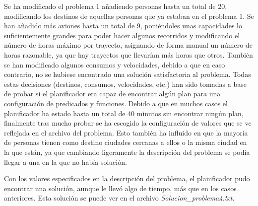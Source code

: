 \documentclass[11pt,a4paper]{article}
\begin{document}
Se ha modificado el problema 1 añadiendo personas hasta un total de 20, modificando los destinos de aquellas personas que ya estaban
en el problema 1. Se han añadido más aviones hasta un total de 9, poniéndoles unas capacidades lo suficientemente grandes para poder
hacer algunos recorridos y modificando el número de horas máximo por trayecto, asignando de forma manual un número de horas razonable,
ya que hay trayectos que llevarían más horas que otros. También se han modificado algunos consumos y velocidades, debido a que en
caso contrario, no se hubiese encontrado una solución satisfactoria al problema. Todas estas decisiones (destinos, consumos,
velocidades, etc.) han sido tomadas a base de probar si el planificador era capaz de encontrar algún plan para una configuración
de predicados y funciones. Debido a que en muchos casos el planificador ha estado hasta un total de 40 minutos sin encontrar ningún
plan, finalmente tras mucho probar se ha escogido la configuración de valores que se ve reflejada en el archivo del problema. Esto
también ha influido en que la mayoría de personas tienen como destino ciudades cercanas a ellos o la misma ciudad en la que están,
ya que cambiando ligeramente la descripción del problema se podía llegar a una en la que no había solución.

Con los valores especificados en la descripción del problema, el planificador pudo encontrar una solución, aunque le llevó algo de
tiempo, más que en los casos anteriores. Esta solución se puede ver en el archivo \textit{Solucion\_problema4.txt}.
\end{document}
